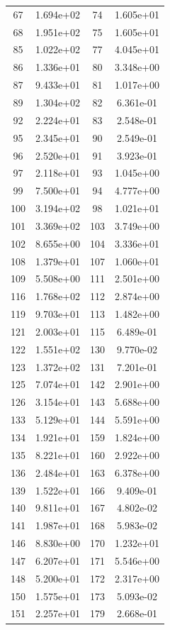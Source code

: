 \documentclass[12pt]{article}
\begin{document}
\begin{longtable}{@{}cccc@{}}
67 & 1.694e+02 & 74 & 1.605e+01 \\
68 & 1.951e+02 & 75 & 1.605e+01 \\
85 & 1.022e+02 & 77 & 4.045e+01 \\
86 & 1.336e+01 & 80 & 3.348e+00 \\
87 & 9.433e+01 & 81 & 1.017e+00 \\
89 & 1.304e+02 & 82 & 6.361e-01 \\
92 & 2.224e+01 & 83 & 2.548e-01 \\
95 & 2.345e+01 & 90 & 2.549e-01 \\
96 & 2.520e+01 & 91 & 3.923e-01 \\
97 & 2.118e+01 & 93 & 1.045e+00 \\
99 & 7.500e+01 & 94 & 4.777e+00 \\
100 & 3.194e+02 & 98 & 1.021e+01 \\
101 & 3.369e+02 & 103 & 3.749e+00 \\
102 & 8.655e+00 & 104 & 3.336e+01 \\
108 & 1.379e+01 & 107 & 1.060e+01 \\
109 & 5.508e+00 & 111 & 2.501e+00 \\
116 & 1.768e+02 & 112 & 2.874e+00 \\
119 & 9.703e+01 & 113 & 1.482e+00 \\
121 & 2.003e+01 & 115 & 6.489e-01 \\
122 & 1.551e+02 & 130 & 9.770e-02 \\
123 & 1.372e+02 & 131 & 7.201e-01 \\
125 & 7.074e+01 & 142 & 2.901e+00 \\
126 & 3.154e+01 & 143 & 5.688e+00 \\
133 & 5.129e+01 & 144 & 5.591e+00 \\
134 & 1.921e+01 & 159 & 1.824e+00 \\
135 & 8.221e+01 & 160 & 2.922e+00 \\
136 & 2.484e+01 & 163 & 6.378e+00 \\
139 & 1.522e+01 & 166 & 9.409e-01 \\
140 & 9.811e+01 & 167 & 4.802e-02 \\
141 & 1.987e+01 & 168 & 5.983e-02 \\
146 & 8.830e+00 & 170 & 1.232e+01 \\
147 & 6.207e+01 & 171 & 5.546e+00 \\
148 & 5.200e+01 & 172 & 2.317e+00 \\
150 & 1.575e+01 & 173 & 5.093e-02 \\
151 & 2.257e+01 & 179 & 2.668e-01 \\

\end{longtable}
\end{document}
